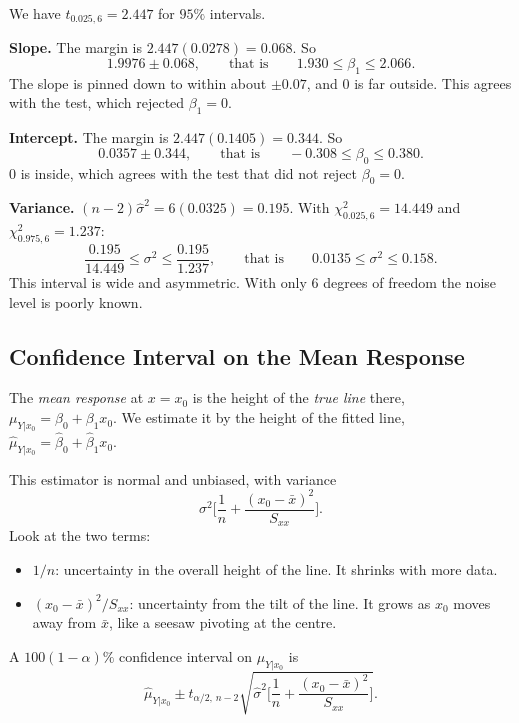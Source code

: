 \begin{example}
We have $t_{0.025,6}=2.447$ for $95\%$ intervals.

\textbf{Slope.} The margin is $2.447(0.0278)=0.068$. So
\[ 1.9976\pm0.068,\qquad\text{that is}\qquad1.930\le\beta_1\le2.066. \]
The slope is pinned down to within about $\pm0.07$, and $0$ is far outside. This agrees with the test, which rejected $\beta_1=0$.

\textbf{Intercept.} The margin is $2.447(0.1405)=0.344$. So
\[ 0.0357\pm0.344,\qquad\text{that is}\qquad-0.308\le\beta_0\le0.380. \]
$0$ is inside, which agrees with the test that did not reject $\beta_0=0$.

\textbf{Variance.} $(n-2)\hat\sigma^2=6(0.0325)=0.195$. With $\chi^2_{0.025,6}=14.449$ and $\chi^2_{0.975,6}=1.237$:
\[ \frac{0.195}{14.449}\le\sigma^2\le\frac{0.195}{1.237},\qquad\text{that is}\qquad0.0135\le\sigma^2\le0.158. \]
This interval is wide and asymmetric. With only $6$ degrees of freedom the noise level is poorly known.
\end{example}

\subsection{Confidence Interval on the Mean Response}

The \emph{mean response} at $x=x_0$ is the height of the \emph{true line} there, $\mu_{Y|x_0}=\beta_0+\beta_1x_0$. We estimate it by the height of the fitted line, $\hat\mu_{Y|x_0}=\hat\beta_0+\hat\beta_1x_0$.

This estimator is normal and unbiased, with variance
\[ \sigma^2\Big[\frac1n+\frac{(x_0-\bar{x})^2}{S_{xx}}\Big]. \]
Look at the two terms:
\begin{itemize}
  \item $1/n$: uncertainty in the overall height of the line. It shrinks with more data.
  \item $(x_0-\bar{x})^2/S_{xx}$: uncertainty from the tilt of the line. It grows as $x_0$ moves away from $\bar{x}$, like a seesaw pivoting at the centre.
\end{itemize}

\begin{theorem}\label{thm:meanresp}
A $100(1-\alpha)\%$ confidence interval on $\mu_{Y|x_0}$ is
\[ \hat\mu_{Y|x_0}\pm t_{\alpha/2,\,n-2}\sqrt{\hat\sigma^2\Big[\frac1n+\frac{(x_0-\bar{x})^2}{S_{xx}}\Big]}. \]
\end{theorem}

